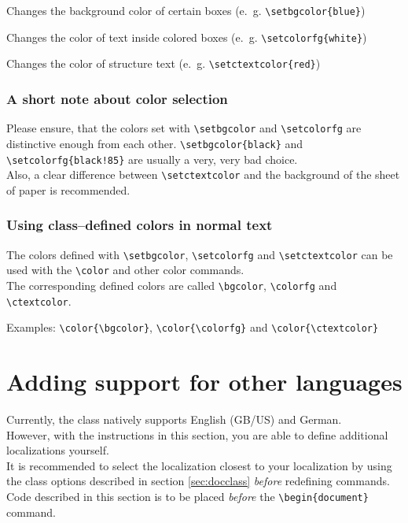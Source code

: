 \documentclass[11pt]{ltxdoc}
\begin{document}
	\medskip
	\DescribeMacro{\setbgcolor}
	Changes the background color of certain boxes (e.~g. \verb|\setbgcolor{blue}|)
	
	\medskip
	\DescribeMacro{\setcolorfg}
	Changes the color of text inside colored boxes (e.~g. \verb|\setcolorfg{white}|)
	
	\medskip
	\DescribeMacro{\setctextcolor}
	Changes the color of structure text (e.~g. \verb|\setctextcolor{red}|)
	
	
	\subsubsection{A short note about color selection}
	Please ensure, that the colors set with \verb|\setbgcolor| and \verb|\setcolorfg| are distinctive enough from each other. \verb|\setbgcolor{black}| and \verb|\setcolorfg{black!85}| are usually a very, very bad choice. \\
	Also, a clear difference between \verb|\setctextcolor| and the background of the sheet of paper is recommended.
	
	
	\subsubsection{Using class--defined colors in normal text}
	The colors defined with \verb|\setbgcolor|, \verb|\setcolorfg| and \verb|\setctextcolor| can be used with the \verb|\color| and other color commands. \\
	The corresponding defined colors are called \verb|\bgcolor|, \verb|\colorfg| and \verb|\ctextcolor|.
	
	\medskip
	Examples: \verb|\color{\bgcolor}|, \verb|\color{\colorfg}| and \verb|\color{\ctextcolor}|
	
	
	
	\section{Adding support for other languages}
	Currently, the class natively supports English (GB/US) and German. \\
	However, with the instructions in this section, you are able to define additional localizations yourself. \\
	It is recommended to select the localization closest to your localization by using the class options described in section \ref{sec:docclass} \textit{before} redefining commands. \\
	Code described in this section is to be placed \textit{before} the \verb|\begin{document}| command.
	
\end{document}
